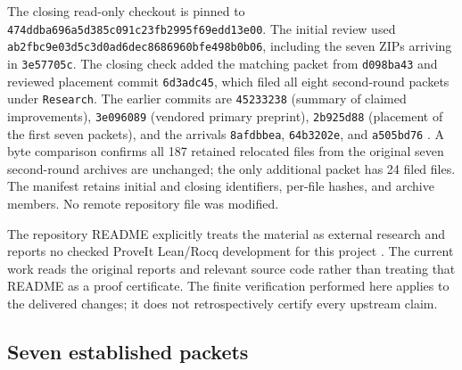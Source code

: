 \documentclass[11pt,letterpaper]{article}
\theoremstyle{remark}\newtheorem{remark}[theorem]{Remark}
\newcommand{\pin}{\texttt{474ddba696a5d385c091c23fb2995f69edd13e00}}
\begin{document}
The closing read-only checkout is pinned to \pin. The initial review used
\texttt{ab2fbc9e03d5c3d0ad6dec8686960bfe498b0b06}, including the seven
ZIPs arriving in \texttt{3e57705c}. The closing check added the matching
packet from \texttt{d098ba43} and reviewed placement commit
\texttt{6d3adc45}, which filed all eight second-round packets under
\texttt{Research}. The earlier commits are \texttt{45233238} (summary of claimed improvements),
\texttt{3e096089} (vendored primary preprint), \texttt{2b925d88}
(placement of the first seven packets), and the arrivals
\texttt{8afdbbea}, \texttt{64b3202e}, and \texttt{a505bd76}
\cite{repo,intake}. A byte comparison confirms all 187 retained relocated
files from the original seven second-round archives are unchanged; the
only additional packet has 24 filed files. The manifest retains initial
and closing identifiers, per-file hashes, and archive members. No remote
repository file was modified.

The repository README explicitly treats the material as external research
and reports no checked ProveIt Lean/Rocq development for this project
\cite{repo}. The current work reads the original reports and relevant
source code rather than treating that README as a proof certificate.
The finite verification performed here applies to the delivered changes;
it does not retrospectively certify every upstream claim.

\subsection{Seven established packets}
\end{document}
